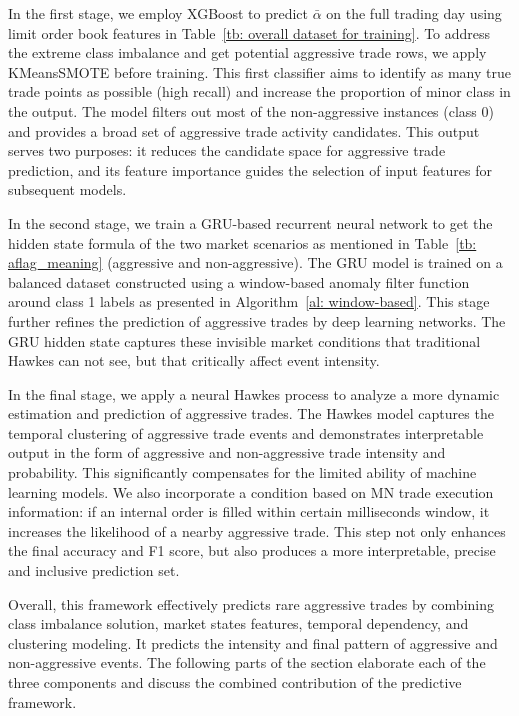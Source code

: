 In the first stage, we employ XGBoost to predict $\bar{\alpha}$ on the full trading day using limit order book features in Table~\ref{tb: overall dataset for training}. To address the extreme class imbalance and get potential aggressive trade rows, we apply KMeansSMOTE before training. This first classifier aims to identify as many true trade points as possible (high recall) and increase the proportion of minor class in the output. The model filters out most of the non-aggressive instances (class 0) and provides a broad set of aggressive trade activity candidates. This output serves two purposes: it reduces the candidate space for aggressive trade prediction, and its feature importance guides the selection of input features for subsequent models.

In the second stage, we train a GRU-based recurrent neural network to get the hidden state formula of the two market scenarios as mentioned in Table~\ref{tb: aflag_meaning} (aggressive and non-aggressive). The GRU model is trained on a balanced dataset constructed using a window-based anomaly filter function around class 1 labels as presented in Algorithm~\ref{al: window-based}. This stage further refines the prediction of aggressive trades by deep learning networks. The GRU hidden state captures these invisible market conditions that traditional Hawkes can not see, but that critically affect event intensity.

In the final stage, we apply a neural Hawkes process to analyze a more dynamic estimation and prediction of aggressive trades. The Hawkes model captures the temporal clustering of aggressive trade events and demonstrates interpretable output in the form of aggressive and non-aggressive trade intensity and probability. This significantly compensates for the limited ability of machine learning models. We also incorporate a condition based on MN trade execution information: if an internal order is filled within certain milliseconds window, it increases the likelihood of a nearby aggressive trade. This step not only enhances the final accuracy and F1 score, but also produces a more interpretable, precise and inclusive prediction set.

Overall, this framework effectively predicts rare aggressive trades by combining class imbalance solution, market states features, temporal dependency, and clustering modeling. It predicts the intensity and final pattern of aggressive and non-aggressive events. The following parts of the section elaborate each of the three components and discuss the combined contribution of the predictive framework.

